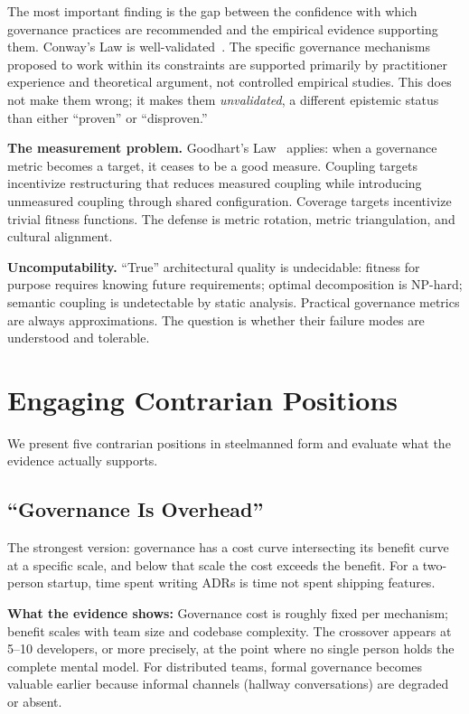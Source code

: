 \documentclass[11pt, a4paper, copyright]{googledeepmind}
\begin{document}
The most important finding is the gap between the confidence with which governance practices are recommended and the empirical evidence supporting them. Conway's Law is well-validated~\citep{conway1968, nagappan2008, maccormack2008}. The specific governance mechanisms proposed to work within its constraints are supported primarily by practitioner experience and theoretical argument, not controlled empirical studies. This does not make them wrong; it makes them \emph{unvalidated}, a different epistemic status than either ``proven'' or ``disproven.''

\textbf{The measurement problem.} Goodhart's Law~\citep{goodhart1975} applies: when a governance metric becomes a target, it ceases to be a good measure. Coupling targets incentivize restructuring that reduces measured coupling while introducing unmeasured coupling through shared configuration. Coverage targets incentivize trivial fitness functions. The defense is metric rotation, metric triangulation, and cultural alignment.

\textbf{Uncomputability.} ``True'' architectural quality is undecidable: fitness for purpose requires knowing future requirements; optimal decomposition is NP-hard; semantic coupling is undetectable by static analysis. Practical governance metrics are always approximations. The question is whether their failure modes are understood and tolerable.


\section{Engaging Contrarian Positions}
\label{sec:contrarian}

We present five contrarian positions in steelmanned form and evaluate what the evidence actually supports.

\subsection{``Governance Is Overhead''}

The strongest version: governance has a cost curve intersecting its benefit curve at a specific scale, and below that scale the cost exceeds the benefit. For a two-person startup, time spent writing ADRs is time not spent shipping features.

\textbf{What the evidence shows:} Governance cost is roughly fixed per mechanism; benefit scales with team size and codebase complexity. The crossover appears at 5--10 developers, or more precisely, at the point where no single person holds the complete mental model. For distributed teams, formal governance becomes valuable earlier because informal channels (hallway conversations) are degraded or absent.
\end{document}
